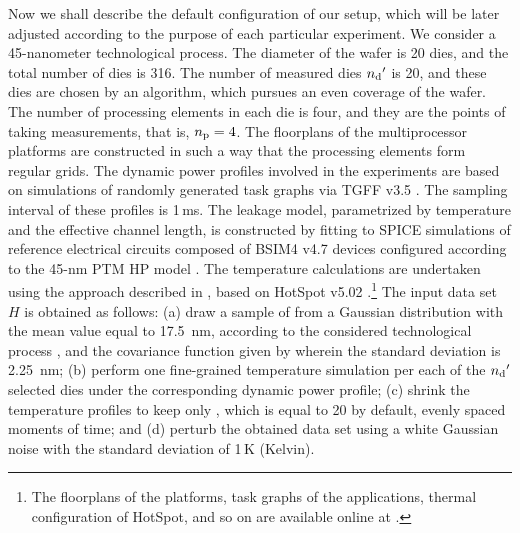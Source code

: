 Now we shall describe the default configuration of our setup, which will be
later adjusted according to the purpose of each particular experiment. We
consider a 45-nanometer technological process. The diameter of the wafer is 20
dies, and the total number of dies \nd is 316. The number of measured dies
${n_\mathrm{d}}'$ is 20, and these dies are chosen by an algorithm, which pursues an even
coverage of the wafer. The number of processing elements in each die is four,
and they are the points of taking measurements, that is, ${n_\mathrm{p}} = 4$. The
floorplans of the multiprocessor platforms are constructed in such a way that
the processing elements form regular grids. The dynamic power profiles involved
in the experiments are based on simulations of randomly generated task graphs
via TGFF v3.5 \cite{dick1998}. The sampling interval of these profiles is
1$\,$ms. The leakage model, parametrized by temperature and the effective
channel length, is constructed by fitting to SPICE simulations of reference
electrical circuits composed of BSIM4 v4.7 devices \cite{bsim} configured
according to the 45-nm PTM HP model \cite{ptm}. The temperature calculations are
undertaken using the approach described in \cite{ukhov2012}, based on HotSpot
v5.02 \cite{skadron2004}.\footnote{The floorplans of the platforms, task graphs
of the applications, thermal configuration of HotSpot, and so on are available
online at \cite{eslab2013}.} The input data set $H$ is obtained as follows: (a)
draw a sample of \g from a Gaussian distribution with the mean value equal to
17.5~nm, according to the considered technological process \cite{ptm}, and the
covariance function given by  wherein the standard
deviation is 2.25~nm; (b) perform one fine-grained temperature simulation per
each of the ${n_\mathrm{d}}'$ selected dies under the corresponding dynamic power profile;
(c) shrink the temperature profiles to keep only \ns, which is equal to 20 by
default, evenly spaced moments of time; and (d) perturb the obtained data set
using a white Gaussian noise with the standard deviation of 1$\,$K (Kelvin).

